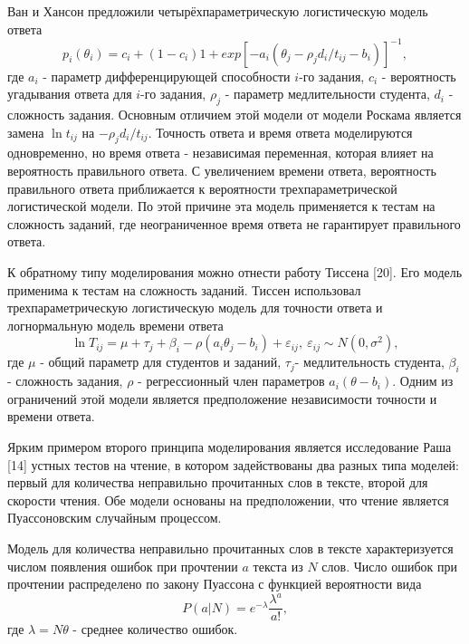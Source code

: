 \documentclass[14pt, a4paper]{extarticle}
\numberwithin{equation}{section}
\begin{document}
{Ван и Хансон предложили четырёхпараметрическую логистическую модель ответа
\begin{equation}
p_i(\theta_i)=c_i+(1-c_i){1+exp[-a_i(\theta_j-\rho_j d_i/ t_{ij}-b_i)]}^{-1},
\end{equation}
где $a_i$ - параметр дифференцирующей способности $i$-го задания, $c_i$ - вероятность угадывания ответа для $i$-го задания, $\rho_j$ - параметр медлительности студента, $d_i$ - сложность задания. Основным отличием этой модели от модели Роскама является замена $\ln t_{ij}$ на $-\rho_j d_i/ t_{ij}$. Точность ответа и время ответа моделируются одновременно, но время ответа - независимая переменная, которая влияет на вероятность правильного ответа. С увеличением времени ответа, вероятность правильного ответа приближается к вероятности трехпараметрической логистической модели. По этой причине эта модель применяется к тестам на сложность заданий, где неограниченное время ответа не гарантирует правильного ответа.

К обратному типу моделирования можно отнести работу Тиссена [20]. Его модель применима к тестам на сложность заданий. Тиссен использовал трехпараметрическую логистическую модель для точности ответа и логнормальную модель времени ответа
\begin{equation}
\ln T_{ij}=\mu+\tau_j+\beta_i-\rho(a_i \theta_j-b_i)+\varepsilon_{ij}, \: \varepsilon_{ij}\sim N(0,\sigma^2),
\end{equation}
где $\mu$ - общий параметр для студентов и заданий,  $\tau_j$- медлительность студента, $\beta_i$ -  сложность задания, $\rho$ - регрессионный член параметров $a_i(\theta-b_i)$. Одним из ограничений этой модели  является предположение независимости точности и времени ответа.

Ярким примером второго принципа моделирования является исследование Раша [14] устных тестов на чтение, в котором задействованы два разных типа моделей: первый для количества неправильно прочитанных слов в тексте, второй для скорости чтения. Обе модели основаны на предположении, что чтение является Пуассоновским случайным процессом.

Модель для количества неправильно прочитанных слов в тексте характеризуется числом появления ошибок при прочтении $a$ текста из $N$ слов. Число ошибок при прочтении распределено по закону Пуассона с функцией вероятности вида
\begin{equation}
P(a|N)=e^{-\lambda}\frac{\lambda^a}{a!},
\end{equation}
где $\lambda=N\theta$ - среднее количество ошибок.

}
\end{document}
